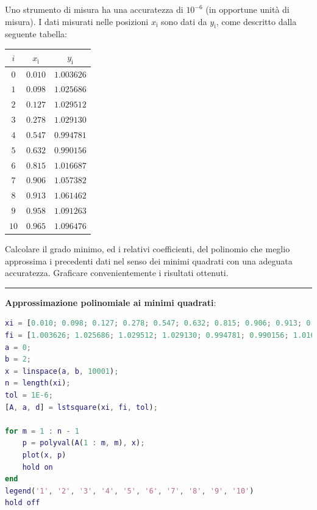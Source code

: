 Uno strumento di misura ha una accuratezza di $10^{-6}$ (in opportune unità di misura). I dati misurati nelle posizioni $x_\mathrm{i}$ sono dati da $y_\mathrm{i}$, come descritto
dalla seguente tabella:
\begin{table}[H]
	\centering
	\begin{tabular}{|c|c|c|}
		\hline
		$i$ & $x_\mathrm{i}$ & $y_\mathrm{i}$ \\
		\hline
		$0$ & $0.010$ & $1.003626$ \\ 
		$1$ & $0.098$ & $1.025686$ \\ 
		$2$ & $0.127$ & $1.029512$ \\ 
		$3$ & $0.278$ & $1.029130$ \\ 
		$4$ & $0.547$ & $0.994781$ \\ 
		$5$ & $0.632$ & $0.990156$ \\ 
		$6$ & $0.815$ & $1.016687$ \\ 
		$7$ & $0.906$ & $1.057382$ \\ 
		$8$ & $0.913$ & $1.061462$ \\ 
		$9$ & $0.958$ & $1.091263$ \\ 
		$10$ & $0.965$ & $1.096476$ \\ 
		\hline
	\end{tabular}
\end{table}
Calcolare il grado minimo, ed i relativi coefficienti, del polinomio che meglio approssima i precedenti dati nel senso dei minimi quadrati con una adeguata accuratezza.
Graficare convenientemente i risultati ottenuti.

\hspace*{\fill}
\par\noindent\rule{\textwidth}{0.4pt}
\hspace*{\fill}

\textbf{Approssimazione polinomiale ai minimi quadrati}:


\begin{lstlisting}[language=Matlab, caption=Codice Matlab]
xi = [0.010; 0.098; 0.127; 0.278; 0.547; 0.632; 0.815; 0.906; 0.913; 0.958; 0.965];
fi = [1.003626; 1.025686; 1.029512; 1.029130; 0.994781; 0.990156; 1.016687; 1.057382; 1.061462; 1.091263; 1.096476];
a = 0;
b = 2;
x = linspace(a, b, 10001);
n = length(xi);
tol = 1E-6;
[A, a, d] = lstsquare(xi, fi, tol);

for m = 1 : n - 1
	p = polyval(A(1 : m, m), x);
	plot(x, p)
	hold on
end
legend('1', '2', '3', '4', '5', '6', '7', '8', '9', '10')
hold off
\end{lstlisting}


